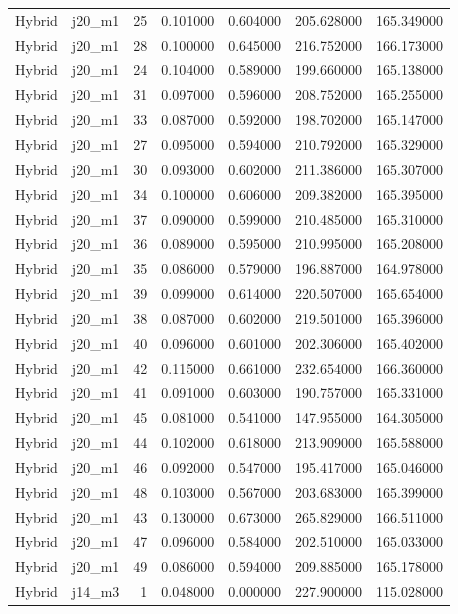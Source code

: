 \begin{tabular}{llrrrrr}
Hybrid & j20_m1 & 25 & 0.101000 & 0.604000 & 205.628000 & 165.349000 \\
Hybrid & j20_m1 & 28 & 0.100000 & 0.645000 & 216.752000 & 166.173000 \\
Hybrid & j20_m1 & 24 & 0.104000 & 0.589000 & 199.660000 & 165.138000 \\
Hybrid & j20_m1 & 31 & 0.097000 & 0.596000 & 208.752000 & 165.255000 \\
Hybrid & j20_m1 & 33 & 0.087000 & 0.592000 & 198.702000 & 165.147000 \\
Hybrid & j20_m1 & 27 & 0.095000 & 0.594000 & 210.792000 & 165.329000 \\
Hybrid & j20_m1 & 30 & 0.093000 & 0.602000 & 211.386000 & 165.307000 \\
Hybrid & j20_m1 & 34 & 0.100000 & 0.606000 & 209.382000 & 165.395000 \\
Hybrid & j20_m1 & 37 & 0.090000 & 0.599000 & 210.485000 & 165.310000 \\
Hybrid & j20_m1 & 36 & 0.089000 & 0.595000 & 210.995000 & 165.208000 \\
Hybrid & j20_m1 & 35 & 0.086000 & 0.579000 & 196.887000 & 164.978000 \\
Hybrid & j20_m1 & 39 & 0.099000 & 0.614000 & 220.507000 & 165.654000 \\
Hybrid & j20_m1 & 38 & 0.087000 & 0.602000 & 219.501000 & 165.396000 \\
Hybrid & j20_m1 & 40 & 0.096000 & 0.601000 & 202.306000 & 165.402000 \\
Hybrid & j20_m1 & 42 & 0.115000 & 0.661000 & 232.654000 & 166.360000 \\
Hybrid & j20_m1 & 41 & 0.091000 & 0.603000 & 190.757000 & 165.331000 \\
Hybrid & j20_m1 & 45 & 0.081000 & 0.541000 & 147.955000 & 164.305000 \\
Hybrid & j20_m1 & 44 & 0.102000 & 0.618000 & 213.909000 & 165.588000 \\
Hybrid & j20_m1 & 46 & 0.092000 & 0.547000 & 195.417000 & 165.046000 \\
Hybrid & j20_m1 & 48 & 0.103000 & 0.567000 & 203.683000 & 165.399000 \\
Hybrid & j20_m1 & 43 & 0.130000 & 0.673000 & 265.829000 & 166.511000 \\
Hybrid & j20_m1 & 47 & 0.096000 & 0.584000 & 202.510000 & 165.033000 \\
Hybrid & j20_m1 & 49 & 0.086000 & 0.594000 & 209.885000 & 165.178000 \\
Hybrid & j14_m3 & 1 & 0.048000 & 0.000000 & 227.900000 & 115.028000 \\

\end{tabular}

